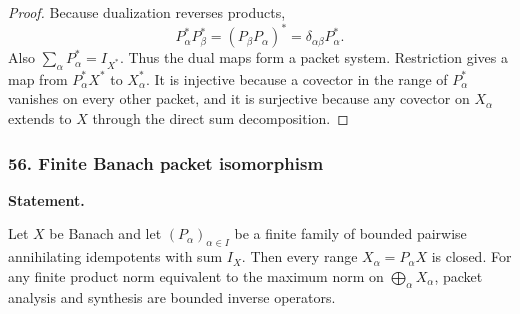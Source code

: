 \begin{proof}
Because dualization reverses products,
\[
P_\alpha^*P_\beta^*=(P_\beta P_\alpha)^*
=\delta_{\alpha\beta}P_\alpha^*.
\]
Also \(\sum_\alpha P_\alpha^*=I_{X^*}\).  Thus the dual maps form a packet system.  Restriction gives a map from \(P_\alpha^*X^*\) to \(X_\alpha^*\).  It is injective because a covector in the range of \(P_\alpha^*\) vanishes on every other packet, and it is surjective because any covector on \(X_\alpha\) extends to \(X\) through the direct sum decomposition.
\end{proof}
\subsubsection*{56. Finite Banach packet isomorphism}
\label{rec:PSC-I-T-BANACH-PACKET-ISOMORPHISM}
\textbf{Statement.}\par
Let $X$ be Banach and let $(P_\alpha)_{\alpha\in I}$ be a finite family of bounded pairwise annihilating idempotents with sum $I_X$.  Then every range $X_\alpha=P_\alpha X$ is closed.  For any finite product norm equivalent to the maximum norm on $\bigoplus_\alpha X_\alpha$, packet analysis and synthesis are bounded inverse operators.

